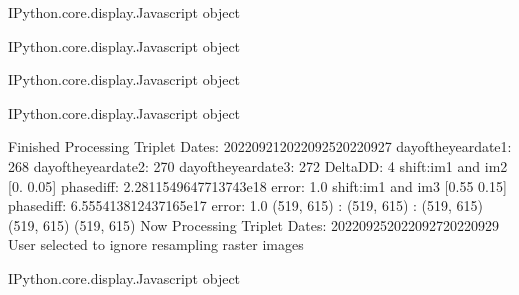 \documentclass[letterpaper,10pt]{sphinxmanual}
\begin{document}
\begin{sphinxVerbatim}[commandchars=\\\{\}]
\PYGZlt{}IPython.core.display.Javascript object\PYGZgt{}
\end{sphinxVerbatim}



\begin{sphinxVerbatim}[commandchars=\\\{\}]
\PYGZlt{}IPython.core.display.Javascript object\PYGZgt{}
\end{sphinxVerbatim}



\begin{sphinxVerbatim}[commandchars=\\\{\}]
\PYGZlt{}IPython.core.display.Javascript object\PYGZgt{}
\end{sphinxVerbatim}



\begin{sphinxVerbatim}[commandchars=\\\{\}]
\PYGZlt{}IPython.core.display.Javascript object\PYGZgt{}
\end{sphinxVerbatim}



\begin{sphinxVerbatim}[commandchars=\\\{\}]
Finished Processing Triplet Dates:  20220921\PYGZhy{}20220925\PYGZhy{}20220927
day\PYGZus{}of\PYGZus{}the\PYGZus{}year\PYGZus{}date1:  268
\PYGZhy{}\PYGZhy{}\PYGZhy{}\PYGZhy{}\PYGZhy{}\PYGZhy{}\PYGZhy{}\PYGZhy{}\PYGZhy{}\PYGZhy{}\PYGZhy{}\PYGZhy{}\PYGZhy{}\PYGZhy{}\PYGZhy{}\PYGZhy{}\PYGZhy{}\PYGZhy{}\PYGZhy{}\PYGZhy{}\PYGZhy{}
day\PYGZus{}of\PYGZus{}the\PYGZus{}year\PYGZus{}date2:  270
\PYGZhy{}\PYGZhy{}\PYGZhy{}\PYGZhy{}\PYGZhy{}\PYGZhy{}\PYGZhy{}\PYGZhy{}\PYGZhy{}\PYGZhy{}\PYGZhy{}\PYGZhy{}\PYGZhy{}\PYGZhy{}\PYGZhy{}\PYGZhy{}\PYGZhy{}\PYGZhy{}\PYGZhy{}\PYGZhy{}\PYGZhy{}
day\PYGZus{}of\PYGZus{}the\PYGZus{}year\PYGZus{}date3:  272
\PYGZhy{}\PYGZhy{}\PYGZhy{}\PYGZhy{}\PYGZhy{}\PYGZhy{}\PYGZhy{}\PYGZhy{}\PYGZhy{}\PYGZhy{}\PYGZhy{}\PYGZhy{}\PYGZhy{}\PYGZhy{}\PYGZhy{}\PYGZhy{}\PYGZhy{}\PYGZhy{}\PYGZhy{}\PYGZhy{}\PYGZhy{}
Delta\PYGZus{}DD: 4
shift:im1 and im2 [0.   0.05] phasediff: 2.2811549647713743e\PYGZhy{}18 error: 1.0
shift:im1 and im3 [\PYGZhy{}0.55 \PYGZhy{}0.15] phasediff: 6.555413812437165e\PYGZhy{}17 error: 1.0
(519, 615) :  (519, 615) :  (519, 615)
(519, 615)
(519, 615)
Now Processing Triplet Dates:  20220925\PYGZhy{}20220927\PYGZhy{}20220929
 User selected to ignore resampling raster images 



\PYGZlt{}IPython.core.display.Javascript object\PYGZgt{}
\end{sphinxVerbatim}
\end{document}
